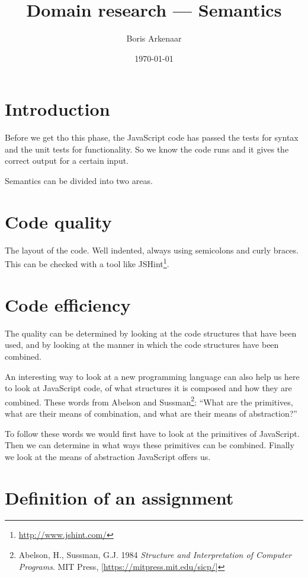 \documentclass{article}
\begin{document}
 

\title{Domain research --- Semantics}
\author{Boris Arkenaar}
\date{\today}
\maketitle 

\section{Introduction} 

Before we get tho this phase, the JavaScript code has passed the tests for
syntax and the unit tests for functionality. So we know the code runs and it
gives the correct output for a certain input.

Semantics can be divided into two areas.

\section{Code quality}

The layout of the code. Well indented, always using semicolons and curly
braces. This can be checked with a tool like
JSHint\footnote{\url{http://www.jshint.com/}}.

\section{Code efficiency}

The quality can be determined by looking at the code structures that have been
used, and by looking at the manner in which the code structures have been
combined.

An interesting way to look at a new programming language can also help us here
to look at JavaScript code, of what structures it is composed and how they are
combined. These words from Abelson and Sussman\footnote{Abelson, H., Sussman,
G.J. 1984 {\em Structure and Interpretation of Computer Programs}. MIT Press,
[\url{https://mitpress.mit.edu/sicp/}]}: ``What are the primitives, what are
their means of combination, and what are their means of abstraction?''

To follow these words we would first have to look at the primitives of
JavaScript. Then we can determine in what ways these primitives can be
combined. Finally we look at the means of abstraction JavaScript offers us.

\section{Definition of an assignment}
\end{document}
